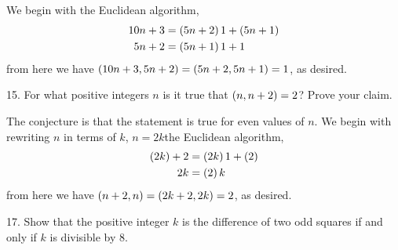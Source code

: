 \begin{mdframed}[style=darkAnswer,frametitle={Joe Starr}]
  We begin with the Euclidean algorithm,
  \begin{align*}
    10n+3 & =\left(5n+2\right)1+\left(5n+1\right) \\
    5n+2  & =\left(5n+1\right)1+1          \\
  \end{align*}
  from here we have $\left(10n+3,5n+2\right)=\left(5n+2,5n+1\right)=1$, as desired.
\end{mdframed}
\newpage
\begin{mdframed}[style=darkQuesion]
  15.  For what positive integers $n$ is it true that $\left(n,n+2\right)=2$? Prove your
  claim.
\end{mdframed}

\begin{mdframed}[style=darkAnswer,frametitle={Joe Starr}]
  The conjecture is that the statement is true for even values of $n$.
  We begin with rewriting $n$ in terms of $k$, $n=2k$the Euclidean algorithm,
  \begin{align*}
    \left(2k\right)+2 & =\left(2k\right)1+\left(2\right) \\
    2k         & =\left(2\right){k}        \\
  \end{align*}
  from here we have $\left(n+2,n\right)=\left(2k+2,2k\right)=2$, as desired.
\end{mdframed}
\newpage
\begin{mdframed}[style=darkQuesion]
  17.  Show that the positive integer $k$ is the difference of two odd squares if
  and only if $k$ is divisible by $8$.
\end{mdframed}

